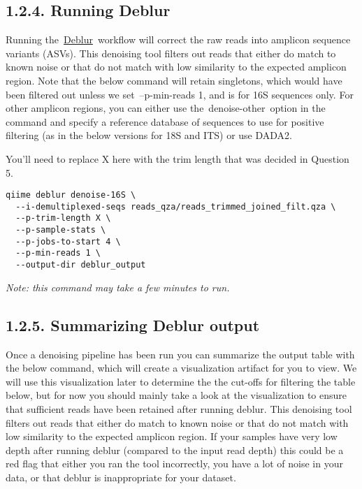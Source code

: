 \documentclass[
]{book}
\begin{document}
\subsection{1.2.4. Running Deblur}\label{running-deblur}

Running the~\href{https://github.com/biocore/deblur}{Deblur}~workflow will correct the raw reads into amplicon sequence variants (ASVs). This denoising tool filters out reads that either do match to known noise or that do not match with low similarity to the expected amplicon region. Note that the below command will retain singletons, which would have been filtered out unless we set~--p-min-reads 1, and is for 16S sequences only. For other amplicon regions, you can either use the~denoise-other~option in the command and specify a reference database of sequences to use for positive filtering (as in the below versions for 18S and ITS) or use DADA2.

You'll need to replace X here with the trim length that was decided in Question 5.

\begin{verbatim}
qiime deblur denoise-16S \
  --i-demultiplexed-seqs reads_qza/reads_trimmed_joined_filt.qza \
  --p-trim-length X \
  --p-sample-stats \
  --p-jobs-to-start 4 \
  --p-min-reads 1 \
  --output-dir deblur_output
\end{verbatim}

\emph{Note: this command may take a few minutes to run.}

\subsection{1.2.5. Summarizing Deblur output}\label{summarizing-deblur-output}

Once a denoising pipeline has been run you can summarize the output table with the below command, which will create a visualization artifact for you to view. We will use this visualization later to determine the the cut-offs for filtering the table below, but for now you should mainly take a look at the visualization to ensure that sufficient reads have been retained after running deblur. This denoising tool filters out reads that either do match to known noise or that do not match with low similarity to the expected amplicon region. If your samples have very low depth after running deblur (compared to the input read depth) this could be a red flag that either you ran the tool incorrectly, you have a lot of noise in your data, or that deblur is inappropriate for your dataset.
\end{document}
